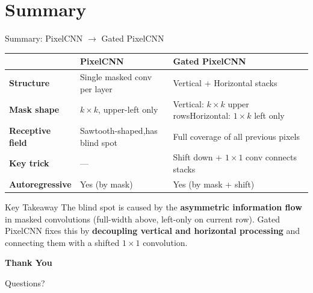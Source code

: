 \documentclass[aspectratio=169, 11pt]{beamer}
\begin{document}
\section{Summary}

\begin{frame}{Summary: PixelCNN $\to$ Gated PixelCNN}

\renewcommand{\arraystretch}{1.6}
\centering
\begin{tabular}{p{3cm} p{4.5cm} p{4.5cm}}
\toprule
& \textbf{PixelCNN} & \textbf{Gated PixelCNN} \\
\midrule
\textbf{Structure} & Single masked conv per layer & Vertical + Horizontal stacks \\
\textbf{Mask shape} & $k \times k$, upper-left only & Vertical: $k \times k$ upper rows\newline Horizontal: $1 \times k$ left only \\
\textbf{Receptive field} & Sawtooth-shaped,\newline has \alert{blind spot} & Full coverage of all previous pixels \\
\textbf{Key trick} & --- & Shift down + $1 \times 1$ conv connects stacks \\
\textbf{Autoregressive} & Yes (by mask) & Yes (by mask + shift) \\
\bottomrule
\end{tabular}

\vspace{0.5cm}
\begin{block}{Key Takeaway}
The blind spot is caused by the \textbf{asymmetric information flow} in masked convolutions (full-width above, left-only on current row). Gated PixelCNN fixes this by \textbf{decoupling vertical and horizontal processing} and connecting them with a shifted $1 \times 1$ convolution.
\end{block}
\end{frame}

\begin{frame}{}
\centering
\vspace{2cm}
{\Huge\bfseries Thank You}

\vspace{1cm}
{\large Questions?}
\end{frame}
\end{document}
